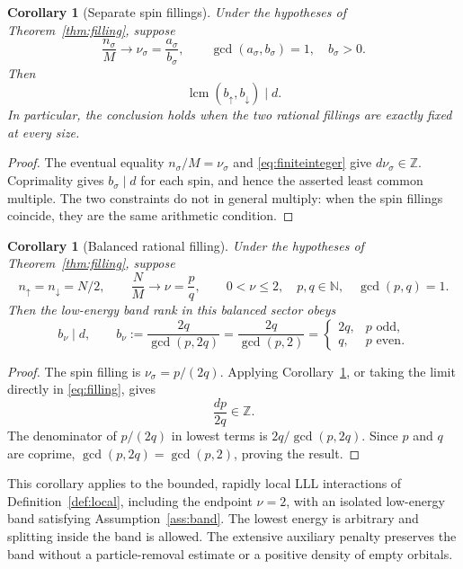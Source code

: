 \documentclass[11pt]{article}
\newtheorem{corollary}[theorem]{Corollary}
\theoremstyle{definition}
\theoremstyle{remark}
\newcommand{\up}{\uparrow}
\newcommand{\dn}{\downarrow}
\begin{document}
\begin{corollary}[Separate spin fillings]\label{cor:separate}
Under the hypotheses of Theorem~\ref{thm:filling}, suppose
\[
 \frac{n_\sigma}{M}\longrightarrow\nu_\sigma
       =\frac{a_\sigma}{b_\sigma},\qquad
 \gcd(a_\sigma,b_\sigma)=1,\quad b_\sigma>0.
\]
Then
\[
 \operatorname{lcm}(b_\up,b_\dn)\mid d.
\]
In particular, the conclusion holds when the two rational
fillings are exactly fixed at every size.
\end{corollary}
\begin{proof}
The eventual equality \(n_\sigma/M=\nu_\sigma\) and
\eqref{eq:finiteinteger} give \(d\nu_\sigma\in\mathbb Z\).
Coprimality gives
\(b_\sigma\mid d\) for each spin, and hence the asserted
least common multiple.  The two constraints do not in general
multiply: when the spin fillings coincide, they are the same
arithmetic condition.
\end{proof}

\begin{corollary}[Balanced rational filling]\label{cor:rational}
Under the hypotheses of Theorem~\ref{thm:filling}, suppose
\[
 n_\up=n_\dn=N/2,\qquad
 \frac{N}{M}\longrightarrow\nu=\frac pq,\qquad
 0<\nu\le2,\quad p,q\in\mathbb N,\quad\gcd(p,q)=1.
\]
Then the low-energy band rank in this balanced sector obeys
\begin{equation}\label{eq:generaldivisor}
 \boxed{\quad b_\nu\mid d,\qquad
 b_\nu:=\frac{2q}{\gcd(p,2q)}
       =\frac{2q}{\gcd(p,2)}
       =\begin{cases}
          2q,&p\text{ odd},\\
          q,&p\text{ even}.
         \end{cases}\quad}
\end{equation}
\end{corollary}
\begin{proof}
The spin filling is \(\nu_\sigma=p/(2q)\).  Applying
Corollary~\ref{cor:separate}, or taking the limit directly in
\eqref{eq:filling}, gives
\begin{equation}\label{eq:balancedinteger}
 \frac{dp}{2q}\in\mathbb Z.
\end{equation}
The denominator of \(p/(2q)\) in lowest terms is
\(2q/\gcd(p,2q)\).  Since \(p\) and \(q\) are coprime,
\(\gcd(p,2q)=\gcd(p,2)\), proving the result.
\end{proof}

This corollary applies to the bounded, rapidly local LLL interactions
of Definition~\ref{def:local}, including the endpoint \(\nu=2\),
with an isolated low-energy band satisfying Assumption~\ref{ass:band}.
The lowest energy is arbitrary and splitting inside the band is
allowed.  The extensive auxiliary penalty preserves the band
without a particle-removal estimate or a positive density of empty
orbitals.
\end{document}
